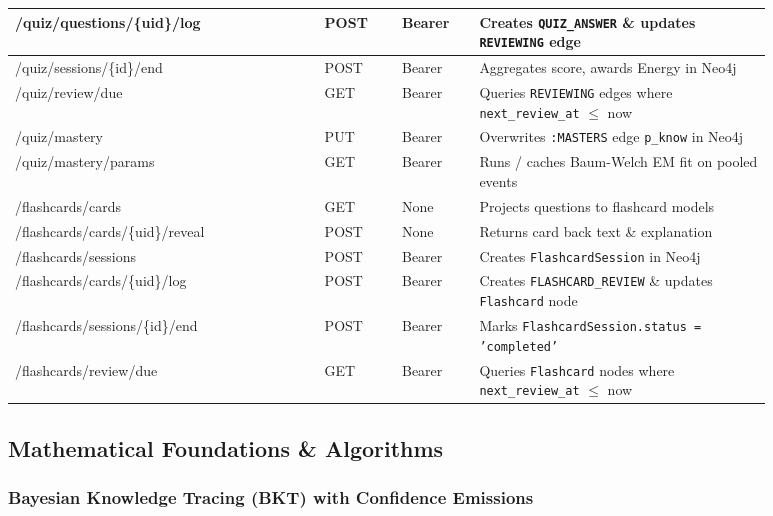 \begin{longtable}{|>{\ttfamily\raggedright\arraybackslash}p{0.36\linewidth}|>{\centering\arraybackslash}p{0.09\linewidth}|>{\centering\arraybackslash}p{0.09\linewidth}|>{\raggedright\arraybackslash}p{0.34\linewidth}|}
\hline
/quiz/\allowbreak questions/\allowbreak\{uid\}/\allowbreak log & POST & Bearer & Creates \texttt{QUIZ\_\allowbreak ANSWER} \& updates \texttt{REVIEWING} edge \\
\hline
/quiz/\allowbreak sessions/\allowbreak\{id\}/\allowbreak end & POST & Bearer & Aggregates score, awards Energy in Neo4j \\
\hline
/quiz/\allowbreak review/\allowbreak due & GET & Bearer & Queries \texttt{REVIEWING} edges where \texttt{next\_review\_at} $\leq$ now \\
\hline
/quiz/\allowbreak mastery & PUT & Bearer & Overwrites \texttt{:MASTERS} edge \texttt{p\_know} in Neo4j \\
\hline
/quiz/\allowbreak mastery/\allowbreak params & GET & Bearer & Runs / caches Baum-Welch EM fit on pooled events \\
\hline
/flashcards/\allowbreak cards & GET & None & Projects questions to flashcard models \\
\hline
/flashcards/\allowbreak cards/\allowbreak\{uid\}/\allowbreak reveal & POST & None & Returns card back text \& explanation \\
\hline
/flashcards/\allowbreak sessions & POST & Bearer & Creates \texttt{FlashcardSession} in Neo4j \\
\hline
/flashcards/\allowbreak cards/\allowbreak\{uid\}/\allowbreak log & POST & Bearer & Creates \texttt{FLASHCARD\_\allowbreak REVIEW} \& updates \texttt{Flashcard} node \\
\hline
/flashcards/\allowbreak sessions/\allowbreak\{id\}/\allowbreak end & POST & Bearer & Marks \texttt{FlashcardSession.\allowbreak status = 'completed'} \\
\hline
/flashcards/\allowbreak review/\allowbreak due & GET & Bearer & Queries \texttt{Flashcard} nodes where \texttt{next\_review\_at} $\leq$ now \\
\hline
\end{longtable}
\endgroup

\subsection*{Mathematical Foundations \& Algorithms}

\subsubsection*{Bayesian Knowledge Tracing (BKT) with Confidence Emissions}

